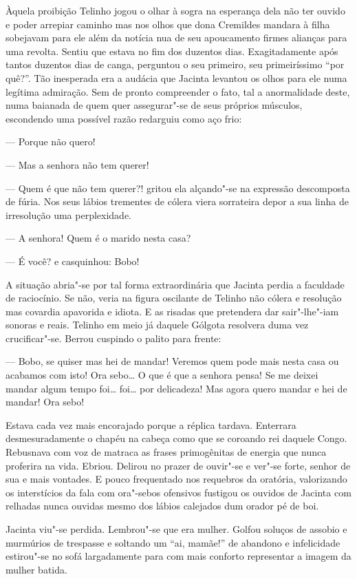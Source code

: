 \begin{linenumbers}
Àquela proibição Telinho jogou o olhar à sogra na esperança dela não ter
ouvido e poder arrepiar caminho mas nos olhos que dona Cremildes mandara
à filha sobejavam para ele além da notícia nua de seu apoucamento firmes
alianças para uma revolta. Sentiu que estava no fim dos duzentos dias.
Exagitadamente após tantos duzentos dias de canga, perguntou o seu
primeiro, seu primeiríssimo ``por quê?''. Tão inesperada era a audácia
que Jacinta levantou os olhos para ele numa legítima admiração. Sem de
pronto compreender o fato, tal a anormalidade deste, numa baianada de
quem quer assegurar"-se de seus próprios músculos, escondendo uma
possível razão redarguiu como aço frio:

--- Porque não quero!

--- Mas a senhora não tem querer!

--- Quem é que não tem querer?! gritou ela alçando"-se na expressão
descomposta de fúria. Nos seus lábios trementes de cólera viera
sorrateira depor a sua linha de irresolução uma perplexidade.

--- A senhora! Quem é o marido nesta casa?

--- É você? e casquinhou: Bobo!

A situação abria"-se por tal forma extraordinária que Jacinta perdia a
faculdade de raciocínio. Se não, veria na figura oscilante de Telinho
não cólera e resolução mas covardia apavorida e idiota. E as risadas que
pretendera dar sair"-lhe"-iam sonoras e reais. Telinho em meio já daquele
Gólgota resolvera duma vez crucificar"-se. Berrou cuspindo o palito para
frente:

--- Bobo, se quiser mas hei de mandar! Veremos quem pode mais nesta casa
ou acabamos com isto! Ora sebo\ldots{} O que é que a senhora pensa! Se me
deixei mandar algum tempo foi\ldots{} foi\ldots{} por delicadeza! Mas agora quero
mandar e hei de mandar! Ora sebo!

Estava cada vez mais encorajado porque a réplica tardava. Enterrara
desmesuradamente o chapéu na cabeça como que se coroando rei daquele
Congo. Rebusnava com voz de matraca as frases primogênitas de energia
que nunca proferira na vida. Ebriou. Delirou no prazer de ouvir"-se e
ver"-se forte, senhor de sua e mais vontades. E pouco frequentado nos
requebros da oratória, valorizando os interstícios da fala com ora"-sebos
ofensivos fustigou os ouvidos de Jacinta com relhadas nunca ouvidas
mesmo dos lábios calejados dum orador pé de boi.

Jacinta viu"-se perdida. Lembrou"-se que era mulher. Golfou soluços de
assobio e murmúrios de trespasse e soltando um ``ai, mamãe!'' de
abandono e infelicidade estirou"-se no sofá largadamente para com mais
conforto representar a imagem da mulher batida.


\end{linenumbers}
